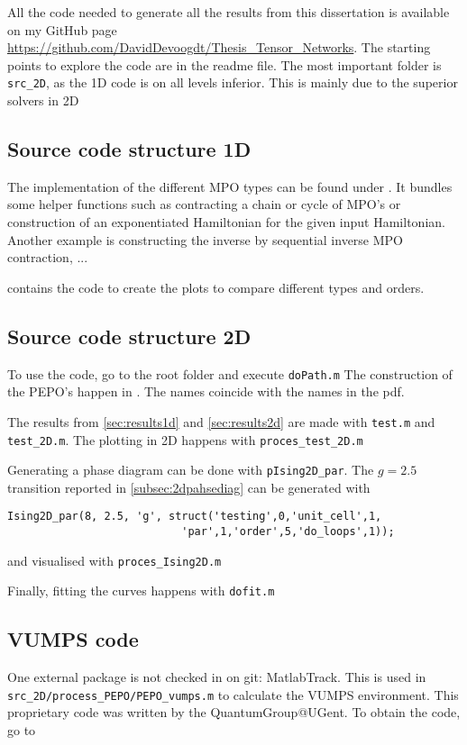 
All the code needed to generate all the results from this dissertation is available on my GitHub page \url{https://github.com/DavidDevoogdt/Thesis_Tensor_Networks}. The starting points to explore the code are in the readme file. The most important folder is \verb#src_2D#, as the 1D code is on all levels inferior. This is mainly due to the superior solvers in 2D

\subsection{Source code structure 1D}

The implementation of the different MPO types can be found under . It bundles some helper functions such as contracting a chain or cycle of MPO's or construction of an exponentiated Hamiltonian for the given input Hamiltonian. Another example is constructing the inverse by sequential inverse MPO contraction, ...

 contains the code to create the plots to compare different types and orders.

\subsection{Source code structure 2D}

To use the code, go to the root folder and execute  \verb#doPath.m#
The construction of the PEPO's happen in . The names coincide with the names in the pdf.

The results from \cref{sec:results1d} and \cref{sec:results2d} are made with  \verb#test.m# and \verb#test_2D.m#. The plotting in 2D happens with \verb#proces_test_2D.m#

Generating a phase diagram can be done with \verb#pIsing2D_par#. The $g=2.5$ transition reported in \cref{subsec:2dpahsediag} can be generated with
\begin{verbatim}
Ising2D_par(8, 2.5, 'g', struct('testing',0,'unit_cell',1,
                           'par',1,'order',5,'do_loops',1));
\end{verbatim}
and visualised with \verb#proces_Ising2D.m#

Finally, fitting the curves happens with \verb#dofit.m#

\subsection{VUMPS code}
One external package is not checked in on git: MatlabTrack. This is used in  \verb#src_2D/process_PEPO/PEPO_vumps.m# to calculate the VUMPS environment. This proprietary code was written by the QuantumGroup@UGent. To obtain the code, go to 
